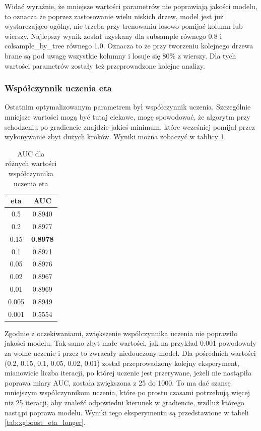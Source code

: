 \documentclass[12pt]{article}
\begin{document}
Widać wyraźnie, że mniejsze wartości parametrów nie poprawiają jakości modelu, to oznacza że poprzez zastosowanie wielu niskich drzew, model jest już wystarczająco ogólny, nie trzeba przy trenowaniu losowo pomijać kolumn lub wierszy. Najlepszy wynik został uzyskany dla subsample równego 0.8 i colsample\_by\_tree równego 1.0. Oznacza to że przy tworzeniu kolejnego drzewa brane są pod uwagę wszystkie kolumny i losuje się 80\% z wierszy. Dla tych wartości parametrów zostały też przeprowadzone kolejne analizy.

\subsubsection{Współczynnik uczenia eta}

Ostatnim optymalizowanym parametrem był współczynnik uczenia. Szczególnie mniejsze wartości mogą być tutaj ciekawe, mogę spowodować, że algorytm przy schodzeniu po gradiencie znajdzie jakieś minimum, które wcześniej pomijał przez wykonywanie zbyt dużych kroków. Wyniki można zobaczyć w tablicy \ref{tab:xgboost_eta}.

\begin{table}[h]
    \centering
    \begin{tabular}{|c|c|}
    \hline
        eta & AUC \\ \hline
        0.5 & 0.8940 \\ \hline 
        0.2 & 0.8977 \\ \hline 
        0.15 & \textbf{0.8978} \\ \hline 
        0.1 & 0.8971 \\ \hline 
        0.05 & 0.8976 \\ \hline 
        0.02 & 0.8967 \\ \hline 
        0.01 & 0.8969 \\ \hline 
        0.005 & 0.8949 \\ \hline 
        0.001 & 0.5554 \\ \hline
    \end{tabular}
    \caption{AUC dla różnych wartości współczynnika uczenia eta}
    \label{tab:xgboost_eta}
\end{table}

Zgodnie z oczekiwaniami, zwiększenie współczynnika uczenia nie poprawiło jakości modelu. Tak samo zbyt małe wartości, jak na przykład 0.001 powodowały za wolne uczenie i przez to zwracały niedouczony model. Dla pośrednich wartości (0.2, 0.15, 0.1, 0.05, 0.02, 0.01) został przeprowadzony kolejny eksperyment, mianowicie liczba iteracji, po której uczenie jest przerywane, jeżeli nie nastąpiła poprawa miary AUC, została zwiększona z 25 do 1000. To ma dać szansę mniejszym współczynnikom uczenia, które po prostu czasami potrzebują więcej niż 25 iteracji, aby znaleźć odpowiedni kierunek w gradiencie, wzdłuż którego nastąpi poprawa modelu. Wyniki tego eksperymentu są przedstawione w tabeli \ref{tab:xgboost_eta_longer}.
\end{document}
